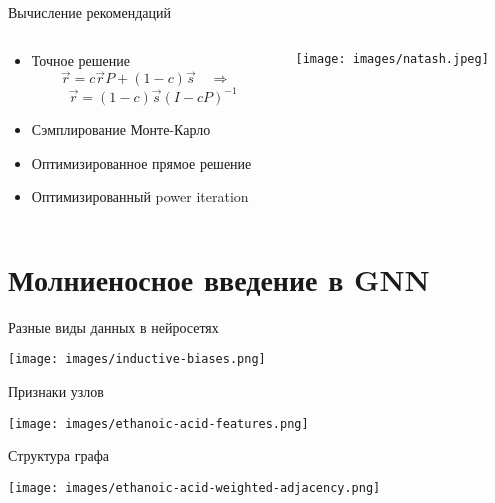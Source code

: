 \documentclass[11pt,aspectratio=169,handout]{beamer}
\begin{document}
\begin{frame}{Вычисление рекомендаций}

\begin{columns}

\begin{column}{0.5\textwidth}
\begin{itemize}[<+->]
\item Точное решение
\[
\vec{r} = c \vec{r} P + (1 - c) \vec{s} \quad \Rightarrow \quad
\]
\[
\vec{r} = (1 - c) \vec{s} \left(I - c P \right)^{-1}
\]
\item Сэмплирование Монте-Карло
\item Оптимизированное прямое решение
\item Оптимизированный power iteration
\end{itemize}
\end{column}

\begin{column}{0.4\textwidth}
\begin{center}
\texttt{[image: images/natash.jpeg]}
\end{center}
\end{column}

\end{columns}

\end{frame}

\section{Молниеносное введение в GNN}

\begin{frame}{Разные виды данных в нейросетях \cite{GNN}}

\begin{center}
\texttt{[image: images/inductive-biases.png]}
\end{center}

\end{frame}

\begin{frame}{Признаки узлов}

\begin{center}
\texttt{[image: images/ethanoic-acid-features.png]}
\end{center}

\end{frame}

\begin{frame}{Структура графа}

\begin{center}
\texttt{[image: images/ethanoic-acid-weighted-adjacency.png]}
\end{center}

\end{frame}
\end{document}
